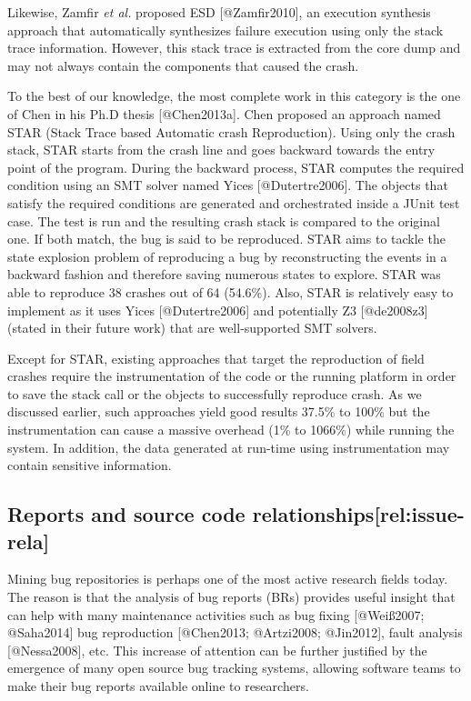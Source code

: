 Likewise, Zamfir {\emph{et al.}} proposed ESD {[}@Zamfir2010{]}, an
execution synthesis approach that automatically synthesizes failure
execution using only the stack trace information. However, this stack
trace is extracted from the core dump and may not always contain the
components that caused the crash.

To the best of our knowledge, the most complete work in this category is
the one of Chen in his Ph.D thesis {[}@Chen2013a{]}. Chen proposed an
approach named STAR (Stack Trace based Automatic crash Reproduction).
Using only the crash stack, STAR starts from the crash line and goes
backward towards the entry point of the program. During the backward
process, STAR computes the required condition using an SMT solver named
Yices {[}@Dutertre2006{]}. The objects that satisfy the required
conditions are generated and orchestrated inside a JUnit test case. The
test is run and the resulting crash stack is compared to the original
one. If both match, the bug is said to be reproduced. STAR aims to
tackle the state explosion problem of reproducing a bug by
reconstructing the events in a backward fashion and therefore saving
numerous states to explore. STAR was able to reproduce 38 crashes out of
64 (54.6\%). Also, STAR is relatively easy to implement as it uses Yices
{[}@Dutertre2006{]} and potentially Z3 {[}@de2008z3{]} (stated in their
future work) that are well-supported SMT solvers.

Except for STAR, existing approaches that target the reproduction of
field crashes require the instrumentation of the code or the running
platform in order to save the stack call or the objects to successfully
reproduce crash. As we discussed earlier, such approaches yield good
results 37.5\% to 100\% but the instrumentation can cause a massive
overhead (1\% to 1066\%) while running the system. In addition, the data
generated at run-time using instrumentation may contain sensitive
information.

\subsection{Reports and source code
relationships{[}rel:issue-rela{]}}\label{reports-and-source-code-relationshipsrelissue-rela}

Mining bug repositories is perhaps one of the most active research
fields today. The reason is that the analysis of bug reports (BRs)
provides useful insight that can help with many maintenance activities
such as bug fixing {[}@Weiß2007; @Saha2014{]} bug reproduction
{[}@Chen2013; @Artzi2008; @Jin2012{]}, fault analysis {[}@Nessa2008{]},
etc. This increase of attention can be further justified by the
emergence of many open source bug tracking systems, allowing software
teams to make their bug reports available online to researchers.

